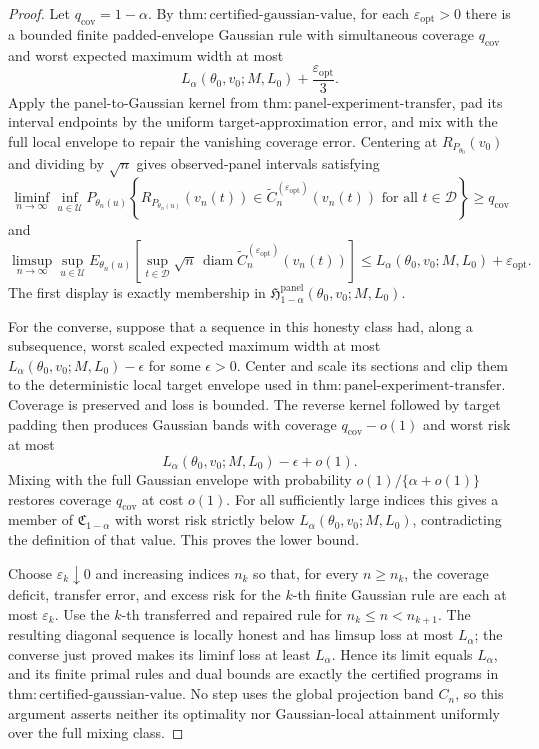 \documentclass{article}
\begin{document}
\begin{proof}
Let \(q_{\mathrm{cov}}=1-\alpha\).  By
\(\mathrm{thm:certified\mbox{-}gaussian\mbox{-}value}\), for each
\(\varepsilon_{\mathrm{opt}}>0\) there is a bounded finite padded-envelope Gaussian rule with simultaneous coverage \(q_{\mathrm{cov}}\) and worst expected maximum width at most
\[
L_\alpha(\theta_0,v_0;M,L_0)+\frac{\varepsilon_{\mathrm{opt}}}{3}.
\]
Apply the panel-to-Gaussian kernel from
\(\mathrm{thm:panel\mbox{-}experiment\mbox{-}transfer}\), pad its interval endpoints by the uniform target-approximation error, and mix with the full local envelope to repair the vanishing coverage error.  Centering at
\(R_{P_{\theta_0}}(v_0)\) and dividing by \(\sqrt n\) gives observed-panel intervals satisfying
\[
\liminf_{n\to\infty}\inf_{u\in\mathcal U}
P_{\theta_n(u)}
\left\{
R_{P_{\theta_n(u)}}(v_n(t))
\in\widetilde C_n^{(\varepsilon_{\mathrm{opt}})}(v_n(t))
\text{ for all }t\in\mathcal D
\right\}
\ge q_{\mathrm{cov}}
\]
and
\[
\limsup_{n\to\infty}\sup_{u\in\mathcal U}
E_{\theta_n(u)}
\left[
\sup_{t\in\mathcal D}
\sqrt n\,
\operatorname{diam}
\widetilde C_n^{(\varepsilon_{\mathrm{opt}})}(v_n(t))
\right]
\le
L_\alpha(\theta_0,v_0;M,L_0)+\varepsilon_{\mathrm{opt}}.
\]
The first display is exactly membership in
\(\mathfrak H^{\mathrm{panel}}_{1-\alpha}(\theta_0,v_0;M,L_0)\).

For the converse, suppose that a sequence in this honesty class had, along a subsequence, worst scaled expected maximum width at most
\(L_\alpha(\theta_0,v_0;M,L_0)-\epsilon\) for some \(\epsilon>0\).  Center and scale its sections and clip them to the deterministic local target envelope used in
\(\mathrm{thm:panel\mbox{-}experiment\mbox{-}transfer}\).  Coverage is preserved and loss is bounded.  The reverse kernel followed by target padding then produces Gaussian bands with coverage
\(q_{\mathrm{cov}}-o(1)\) and worst risk at most
\[
L_\alpha(\theta_0,v_0;M,L_0)-\epsilon+o(1).
\]
Mixing with the full Gaussian envelope with probability
\(o(1)/\{\alpha+o(1)\}\) restores coverage \(q_{\mathrm{cov}}\) at cost \(o(1)\).  For all sufficiently large indices this gives a member of
\(\mathfrak C_{1-\alpha}\) with worst risk strictly below
\(L_\alpha(\theta_0,v_0;M,L_0)\), contradicting the definition of that value.  This proves the lower bound.

Choose \(\varepsilon_k\downarrow0\) and increasing indices \(n_k\) so that, for every \(n\ge n_k\), the coverage deficit, transfer error, and excess risk for the \(k\)-th finite Gaussian rule are each at most \(\varepsilon_k\).  Use the \(k\)-th transferred and repaired rule for
\(n_k\le n<n_{k+1}\).  The resulting diagonal sequence is locally honest and has limsup loss at most \(L_\alpha\); the converse just proved makes its liminf loss at least \(L_\alpha\).  Hence its limit equals \(L_\alpha\), and its finite primal rules and dual bounds are exactly the certified programs in
\(\mathrm{thm:certified\mbox{-}gaussian\mbox{-}value}\).  No step uses the global projection band \(C_n\), so this argument asserts neither its optimality nor Gaussian-local attainment uniformly over the full mixing class.
\end{proof}
\end{document}
